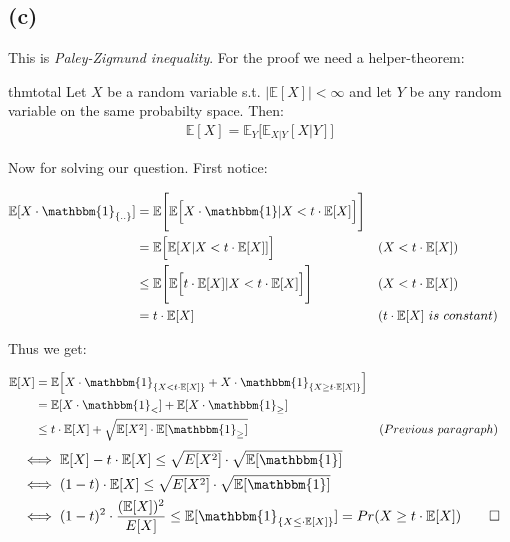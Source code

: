 \documentclass[a4paper]{article}
\newcommand{\lc}{\left\{}
\newcommand{\rc}{\right\}}
\newcommand{\E}{\mathbb{E}}
\newcommand{\I}{\mathbbm{1}}
\newcommand{\qedsquare}{\tag*{$\square$}}
\begin{document}
\subsection {(c)}

This is \textit{Paley-Zigmund inequality}. For the proof we need a helper-theorem:

\begin{restatable}{thm}{total}
    \label{thm:total}
    Let $X$ be a random variable s.t. $|\E[X]|<\infty$ and let $Y$ be any random variable on the same probabilty space.
    Then:
    \begin{align*}
        \E[X] = \E_Y \Big[ \E_{X|Y} [X|Y] \Big]
    \end{align*}
\end{restatable}

Now for solving our question. First notice:

\begin{align*}
    \E[X \cdot \I_{\lc..\rc}] &= \E \Bigg[ \E \Big[ X \cdot \I | X < t \cdot \E[X] \Big] \Bigg] \\
    &= \E \Big[ \E [ X | X < t \cdot \E[X] ] \Big] && (X<t \cdot \E[X]) \\
    &\leq \E \Bigg[ \E \Big[ t\cdot\E[X] | X < t \cdot \E[X] \Big] \Bigg] && (X<t\cdot\E[X]) \\
    &= t\cdot\E[X] && (t\cdot\E[X]\ is\ constant)
\end{align*}

Thus we get:

\begin{align*}
    \E[X] &= \E \Big[ X \cdot \I_{\lc X < t \cdot \E[X] \rc} + X \cdot \I_{ \lc X \geq t \cdot \E[X] \rc } \Big] \\
    &= \E[X\cdot\I_{<}] + \E[X\cdot\I_{\geq}] \\
    &\leq t\cdot\E[X] + \sqrt{ \E[X^2] \cdot \E[\I_{\geq}] } && (Previous\ paragraph) \\
\end{align*}
\begin{align*}
    &\iff \E[X] - t\cdot\E[X] \leq \sqrt{E[X^2]} \cdot \sqrt{\E[\I]} \\
    &\iff (1-t) \cdot \E[X] \leq \sqrt{E[X^2]} \cdot \sqrt{\E[\I]}  \\
    &\iff (1-t)^2 \cdot \frac{(\E[X])^2}{E[X]} \leq \E[ \I_{ \lc X \leq \cdot \E[X] \rc} ]
    = Pr( X \geq t \cdot \E[X] )
    \qedsquare
\end{align*}

\newpage
\end{document}
